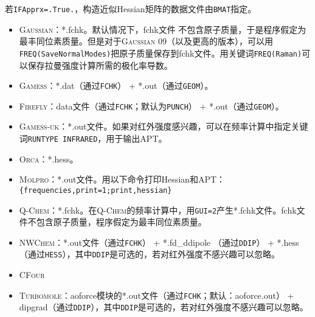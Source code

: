 \documentclass[12pt,a4paper,openany,twoside,cap,UTF8]{ctexbook}
\begin{document}
若\verb|IFApprx=.True.|，构造近似Hessian矩阵的数据文件由\verb|BMAT|指定。

\begin{itemize}
\item \textsc{Gaussian}：*.fchk。默认情况下，fchk文件 不包含原子质量，于是程序假定为最丰同位素质量。但是对于\textsc{Gaussian} 09（以及更高的版本），可以用\texttt{FREQ(SaveNormalModes)}把原子质量保存到fchk文件。用关键词\texttt{FREQ(Raman)}可以保存拉曼强度计算所需的极化率导数。
\item \textsc{Gamess}：*.dat（通过\verb|FCHK|） + *.out（通过\verb|GEOM|）。
\item \textsc{Firefly}：data文件（通过\verb|FCHK|；默认为\verb|PUNCH|） + *.out（通过\verb|GEOM|）。
\item \textsc{Gamess-uk}：*.out文件。如果对红外强度感兴趣，可以在频率计算中指定关键词\texttt{RUNTYPE INFRARED}，用于输出APT。
\item \textsc{Orca}：*.hess。
\item \textsc{Molpro}：*.out文件。用以下命令打印Hessian和APT： \\
\verb|{frequencies,print=1;print,hessian}|
\item \textsc{Q-Chem}：*.fchk。在\textsc{Q-Chem}的频率计算中，用\texttt{GUI=2}产生*.fchk文件。fchk文件不包含原子质量，程序假定为最丰同位素质量。
\item \textsc{NWChem}：*.out文件（通过\verb|FCHK|） + *.fd{\_}ddipole （通过\verb|DDIP|） +
*.hess （通过\verb|HESS|），其中\verb|DDIP|是可选的，若对红外强度不感兴趣可以忽略。
\item \textsc{CFour}
\item \textsc{Turbomole}：aoforce模块的*.out文件（通过\verb|FCHK|；默认：aoforce.out） +
dipgrad（通过\verb|DDIP|），其中\verb|DDIP|是可选的，若对红外强度不感兴趣可以忽略。

\end{itemize}
\end{document}

